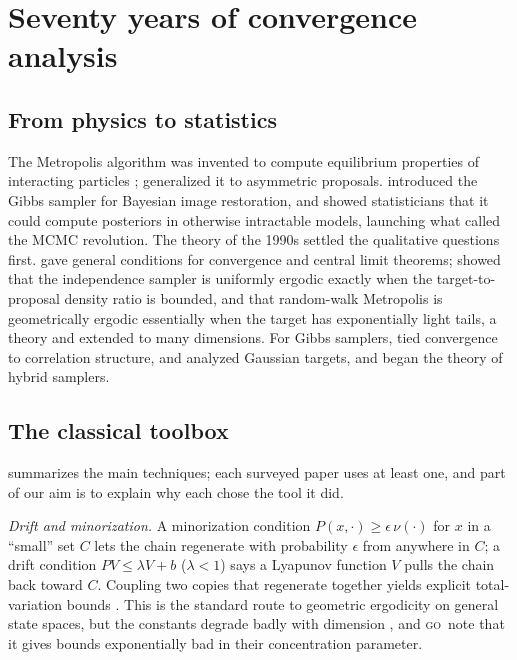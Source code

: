 \documentclass[11pt]{article}
\theoremstyle{remark}
\newcommand{\GO}{\textsc{go}}
\begin{document}
\section{Seventy years of convergence analysis}\label{sec:history}

\subsection{From physics to statistics}
The Metropolis algorithm was invented to compute equilibrium properties of interacting particles \citep{metropolis1953}; \citet{hastings1970} generalized it to asymmetric proposals. \citet{geman1984} introduced the Gibbs sampler for Bayesian image restoration, and \citet{gelfand1990} showed statisticians that it could compute posteriors in otherwise intractable models, launching what \citet{diaconis2009revolution} called the MCMC revolution. The theory of the 1990s settled the qualitative questions first. \citet{tierney1994} gave general conditions for convergence and central limit theorems; \citet{mengersen1996} showed that the independence sampler is uniformly ergodic exactly when the target-to-proposal density ratio is bounded, and that random-walk Metropolis is geometrically ergodic essentially when the target has exponentially light tails, a theory \citet{roberts1996geometric} and \citet{jarner2000} extended to many dimensions. For Gibbs samplers, \citet{liu1994covariance} tied convergence to correlation structure, \citet{amit1991} and \citet{roberts1997updating} analyzed Gaussian targets, and \citet{roberts1997geometric} began the theory of hybrid samplers.

\subsection{The classical toolbox}
 summarizes the main techniques; each surveyed paper uses at least one, and part of our aim is to explain why each chose the tool it did.

\emph{Drift and minorization.} A minorization condition $P(x,\cdot)\ge\epsilon\,\nu(\cdot)$ for $x$ in a ``small'' set $C$ lets the chain regenerate with probability $\epsilon$ from anywhere in $C$; a drift condition $PV\le\lambda V+b$ ($\lambda<1$) says a Lyapunov function $V$ pulls the chain back toward $C$. Coupling two copies that regenerate together yields explicit total-variation bounds \citep{rosenthal1995}. This is the standard route to geometric ergodicity on general state spaces, but the constants degrade badly with dimension \citep{qin2021limitations,qin2022wasserstein}, and \GO\ note that it gives bounds exponentially bad in their concentration parameter.
\end{document}

